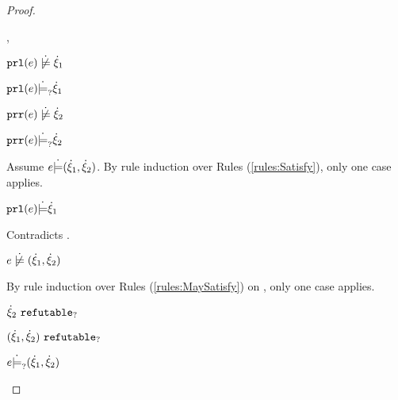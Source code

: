 \begin{proof}
\begin{byCases}
\begin{byCases}
\begin{byCases}
        \item[\cmaysatisfy{\hprl{e}}{\hxi_1},\cmaysatisfy{\hprr{e}}{\hxi_2}]
            \begin{pfsteps*}
            \item $\cnotsatisfy{\hprl{e}}{\hxi_1}$  
            \item $\mathtt{prl}(e) \dot{\models}_{?} \dot{\xi}_1$  
            \item $\cnotsatisfy{\hprr{e}}{\hxi_2}$  
            \item $\mathtt{prr}(e) \dot{\models}_{?} \dot{\xi}_2$  
            \end{pfsteps*}
            Assume $e \dot{\models} (\dot{\xi}_1 , \dot{\xi}_2)$. By rule induction over Rules (\ref{rules:Satisfy}), only one case applies.
            \begin{byCases}
            \item[\text{(\ref{rule:CSNotIntroPair})}]
                \begin{pfsteps*}
                \item $\mathtt{prl}(e) \dot{\models} \dot{\xi}_1$ 
                \end{pfsteps*}
                Contradicts .
            \end{byCases}
            \begin{pfsteps*}
            \item $\cnotsatisfy{e}{\cpair{\hxi_1}{\hxi_2}}$  
            \end{pfsteps*}
            By rule induction over Rules (\ref{rules:MaySatisfy}) on , only one case applies. 
            \begin{byCases}
            \item[\text{(\ref{rule:CMSNotIntro})}]
                \begin{pfsteps*}
                \item $\dot{\xi}_2 ~\mathtt{refutable}_?$  
                \item $(\dot{\xi}_1 , \dot{\xi}_2) ~\mathtt{refutable}_?$  
                \item $e \dot{\models}_{?} (\dot{\xi}_1 , \dot{\xi}_2)$  

\end{pfsteps*}
\end{byCases}
\end{byCases}
\end{byCases}
\end{byCases}
\end{proof}
